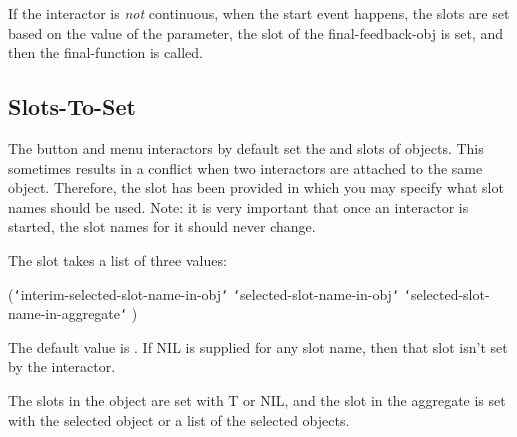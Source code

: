 If the interactor is {\it not} continuous, when the start event happens, the
 slots are set based on the value of the  parameter,
the  slot of the final-feedback-obj is set, and then the
final-function is called.


\subsection{Slots-To-Set}
\label{slots-to-set}
The button and menu interactors by default set the 
and  slots of objects.  This sometimes results
in a conflict when two interactors are attached to the same object.
Therefore, the  slot has been provided in which you
may specify what slot names should be used.  Note: it is very
important that once an interactor is started, the slot names for it
should never change.

The  slot takes a list of three values:
\begin{programexample}
 ({\tt\char`\<}interim-selected-slot-name-in-obj{\tt\char`\>}
  {\tt\char`\<}selected-slot-name-in-obj{\tt\char`\>}
  {\tt\char`\<}selected-slot-name-in-aggregate{\tt\char`\>} )
\end{programexample}
The default value is .  If
NIL is supplied for any slot name, then that slot isn't set by the
interactor.

The slots in the object are
set with T or NIL, and the slot in the aggregate is set with the
selected object or a list of the selected objects.


